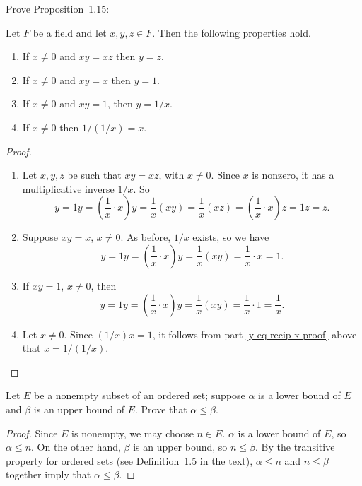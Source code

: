  Prove Proposition~1.15:
\begin{prop}
  Let $F$ be a field and let $x,y,z\in F$. Then the following
  properties hold.
  \begin{enumerate}
  \item If $x\neq0$ and $xy = xz$ then $y = z$.
  \item If $x\neq0$ and $xy = x$ then $y = 1$.
  \item If $x\neq0$ and $xy = 1$, then $y = 1/x$.
  \item If $x\neq0$ then $1/(1/x) = x$.
  \end{enumerate}
\end{prop}
\begin{proof}
  \begin{enumerate}
  \item Let $x,y,z$ be such that $xy = xz$, with $x\neq0$. Since $x$
    is nonzero, it has a multiplicative inverse $1/x$. So
    \begin{equation*}
      y = 1y = \left(\frac1x\cdot x\right)y
      = \frac1x(xy) = \frac1x(xz)
      = \left(\frac1x\cdot x\right)z = 1z = z.
    \end{equation*}

  \item Suppose $xy = x$, $x\neq0$. As before, $1/x$ exists, so we have
    \begin{equation*}
      y = 1y = \left(\frac1x\cdot x\right)y
      = \frac1x(xy) = \frac1x\cdot x = 1.
    \end{equation*}

  \item \label{y-eq-recip-x-proof} If $xy = 1$, $x\neq0$, then
    \begin{equation*}
      y = 1y = \left(\frac1x\cdot x\right)y
      = \frac1x(xy) = \frac1x\cdot1
      = \frac1x.
    \end{equation*}

  \item Let $x\neq0$. Since $(1/x)x = 1$, it follows from part
    \ref{y-eq-recip-x-proof} above that $x = 1/(1/x)$.
  \end{enumerate}
\end{proof}

 Let $E$ be a nonempty subset of an ordered set; suppose
$\alpha$ is a lower bound of $E$ and $\beta$ is an upper bound of
$E$. Prove that $\alpha\leq\beta$.
\begin{proof}
  Since $E$ is nonempty, we may choose $n\in E$. $\alpha$ is a lower
  bound of $E$, so $\alpha\leq n$. On the other hand, $\beta$ is an
  upper bound, so $n\leq\beta$. By the transitive property for ordered
  sets (see Definition~1.5 in the text), $\alpha\leq n$ and
  $n\leq\beta$ together imply that $\alpha\leq\beta$.
\end{proof}

